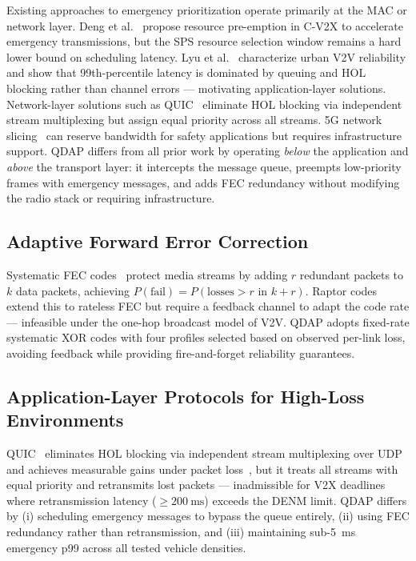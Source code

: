 \documentclass[journal]{IEEEtran}
\begin{document}
Existing approaches to emergency prioritization operate primarily at the
MAC or network layer.
Deng et al.~\cite{Deng2021} propose resource pre-emption in C-V2X to
accelerate emergency transmissions, but the SPS resource selection window
remains a hard lower bound on scheduling latency.
Lyu et al.~\cite{Lyu2021} characterize urban V2V reliability and show that
99th-percentile latency is dominated by queuing and HOL blocking rather than
channel errors — motivating application-layer solutions.
Network-layer solutions such as QUIC~\cite{RFC9000} eliminate HOL blocking via
independent stream multiplexing but assign equal priority across all streams.
5G network slicing~\cite{Campolo2017} can reserve bandwidth for safety
applications but requires infrastructure support.
QDAP differs from all prior work by operating \emph{below} the application
and \emph{above} the transport layer: it intercepts the message queue,
preempts low-priority frames with emergency messages, and adds FEC redundancy
without modifying the radio stack or requiring infrastructure.

\subsection{Adaptive Forward Error Correction}

Systematic FEC codes~\cite{RFC5109} protect media streams by adding $r$
redundant packets to $k$ data packets, achieving $P(\text{fail}) =
P(\text{losses} > r \text{ in } k{+}r)$.
Raptor codes~\cite{Shokrollahi2006} extend this to rateless FEC but require
a feedback channel to adapt the code rate — infeasible under the one-hop
broadcast model of V2V.
QDAP adopts fixed-rate systematic XOR codes with four profiles selected
based on observed per-link loss, avoiding feedback while providing
fire-and-forget reliability guarantees.

\subsection{Application-Layer Protocols for High-Loss Environments}

QUIC~\cite{RFC9000} eliminates HOL blocking via independent stream
multiplexing over UDP and achieves measurable gains under packet
loss~\cite{Langley2017}, but it treats all streams with equal priority and
retransmits lost packets — inadmissible for V2X deadlines where retransmission
latency ($\geq \SI{200}{\milli\second}$) exceeds the DENM limit.
QDAP differs by (i) scheduling emergency messages to bypass the queue
entirely, (ii) using FEC redundancy rather than retransmission, and
(iii) maintaining sub-\SI{5}{\milli\second} emergency p99 across all tested
vehicle densities.
\end{document}
